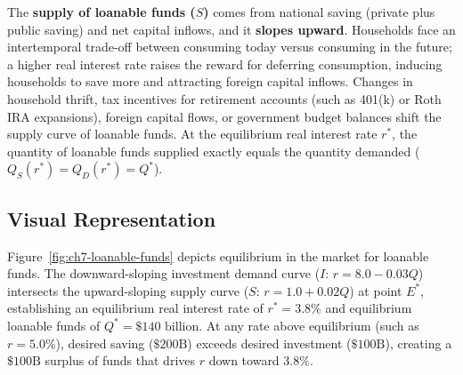 \documentclass[11pt,letterpaper]{article}
\begin{document}
The \textbf{supply of loanable funds ($S$)} comes from national saving (private plus public saving) and net capital inflows, and it \textbf{slopes upward}. Households face an intertemporal trade-off between consuming today versus consuming in the future; a higher real interest rate raises the reward for deferring consumption, inducing households to save more and attracting foreign capital inflows. Changes in household thrift, tax incentives for retirement accounts (such as 401(k) or Roth IRA expansions), foreign capital flows, or government budget balances shift the supply curve of loanable funds. At the equilibrium real interest rate $r^*$, the quantity of loanable funds supplied exactly equals the quantity demanded ($Q_S(r^*) = Q_D(r^*) = Q^*$).

\subsection*{Visual Representation}
Figure~\ref{fig:ch7-loanable-funds} depicts equilibrium in the market for loanable funds. The downward-sloping investment demand curve ($I$: $r = 8.0 - 0.03Q$) intersects the upward-sloping supply curve ($S$: $r = 1.0 + 0.02Q$) at point $E^*$, establishing an equilibrium real interest rate of $r^* = 3.8\%$ and equilibrium loanable funds of $Q^* = \$140\text{ billion}$. At any rate above equilibrium (such as $r = 5.0\%$), desired saving ($\$200\text{B}$) exceeds desired investment ($\$100\text{B}$), creating a $\$100\text{B}$ surplus of funds that drives $r$ down toward $3.8\%$.
\end{document}
